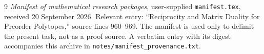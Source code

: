 \documentclass[11pt]{article}
\numberwithin{equation}{section}
\theoremstyle{definition}
\theoremstyle{remark}
\begin{document}
\begin{thebibliography}{9}
\emph{Manifest of mathematical research packages},
user-supplied \texttt{manifest.tex}, received 20 September 2026.
Relevant entry: ``Reciprocity and Matrix Duality for Preorder Polytopes,''
source lines 960--969. The manifest is used only to delimit the present task,
not as a proof source. A verbatim entry with its digest accompanies this
archive in \texttt{notes/manifest\_provenance.txt}.
\end{thebibliography}
\end{document}
